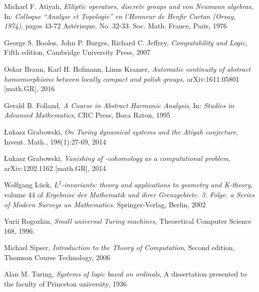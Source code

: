 \begin{thebibliography}{1}

	Michael F. Atiyah,
	\emph{Elliptic operators, discrete groups and von Neumann algebras,}
	In: \emph{Colloque ``Analyse et Topologie'' en l'Honneur de Henfir Cartan (Orsay, 1974)},
	pages 43-72 Ast\'erisque,
	No. 32-33. Soc. Math. France,
	Paris,
	1976

	George S. Boolos, John P. Burges, Richard C. Jeffrey,
	\emph{Computability and Logic},
	Fifth edition,
	Cambridge University Press,
	2007

	Oskar Braun, Karl H. Hofmann, Linus Kramer,
	\emph{Automatic continuity of abstract homomorphisms between locally compact and polish groups},
	arXiv:1611.05801 [math.GR],
	2016

	Gerald B. Folland,
	\emph{A Course in Abstract Harmonic Analysis},
	In: \emph{Studies in Advanced Mathematics},
	CRC Press,
	Boca Raton,
	1995

	\L{}ukasz Grabowski,
	\emph{On Turing dynamical systems and the Atiyah conjecture},
	Invent. Math., 198(1):27-69,
	2014

	\L{}ukasz Grabowski,
	\emph{Vanishing of \ltwo-cohomology as a computational problem},
	arXiv:1202.1162 [math.GR],
	2014

	Wolfgang L\"uck,
	\emph{$L^2$-invariants: theory and applications to geometry and K-theory},
	volume 44 of \emph{Ergebnise der Mathematik und ihrer Grenzgebiete. 3. Folge. a Series of Modern Surveys un Mathematics.}
	Springer-Verlag, Berlin,
	2002

	Yurii Rogozhin,
	\emph{Small universal Turing machines},
	Theoretical Computer Science 168,
	1996.

	Michael Sipser,
	\emph{Introduction to the Theory of Computation},
	Second edition,
	Thomson Course Technology,
	2006

	Alan M. Turing,
	\emph{Systems of logic based on ordinals},
	A dissertation presented to the faculty of Princeton university,
	1936

\end{thebibliography}
